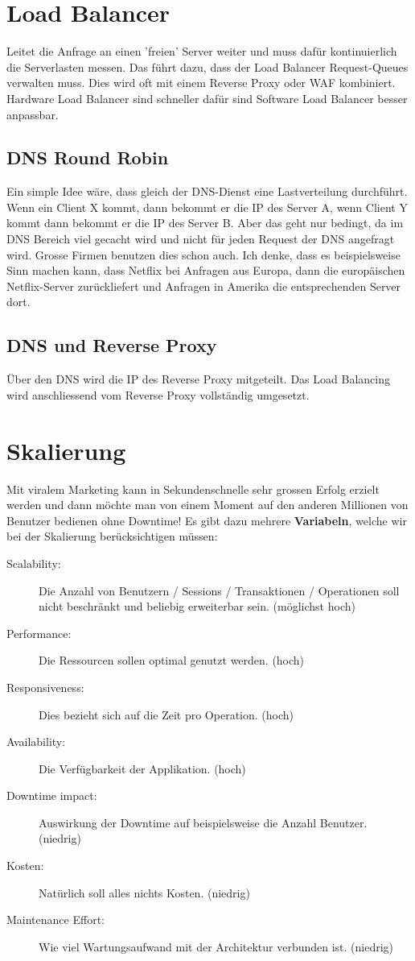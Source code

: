 \section{Load Balancer}
Leitet die Anfrage an einen 'freien' Server weiter und muss dafür kontinuierlich die Serverlasten messen. Das führt dazu, dass der Load Balancer Request-Queues verwalten muss. Dies wird oft mit einem Reverse Proxy oder WAF kombiniert. Hardware Load Balancer sind schneller dafür sind Software Load Balancer besser anpassbar. 

\subsection{DNS Round Robin}
Ein simple Idee wäre, dass gleich der DNS-Dienst eine Lastverteilung durchführt. Wenn ein Client X kommt, dann bekommt er die IP des Server A, wenn Client Y kommt dann bekommt er die IP des Server B. Aber das geht nur bedingt, da im DNS Bereich viel gecacht wird und nicht für jeden Request der DNS angefragt wird. Grosse Firmen benutzen dies schon auch. Ich denke, dass es beispielsweise Sinn machen kann, dass Netflix bei Anfragen aus Europa, dann die europäischen Netflix-Server zurückliefert und Anfragen in Amerika die entsprechenden Server dort.

\subsection{DNS und Reverse Proxy}
Über den DNS wird die IP des Reverse Proxy mitgeteilt. Das Load Balancing wird anschliessend vom Reverse Proxy vollständig umgesetzt.

\section{Skalierung}
Mit viralem Marketing kann in Sekundenschnelle sehr grossen Erfolg erzielt werden und dann möchte man von einem Moment auf den anderen Millionen von Benutzer bedienen ohne Downtime! Es gibt dazu mehrere \textbf{Variabeln}, welche wir bei der Skalierung berücksichtigen müssen:

\begin{description}
	\item[Scalability:] Die Anzahl von Benutzern / Sessions / Transaktionen / Operationen soll nicht beschränkt und beliebig erweiterbar sein. (möglichst hoch)
	\item[Performance:] Die Ressourcen sollen optimal genutzt werden. (hoch)
	\item[Responsiveness:] Dies bezieht sich auf die Zeit pro Operation. (hoch)
	\item[Availability:] Die Verfügbarkeit der Applikation. (hoch)
	\item[Downtime impact:] Auswirkung der Downtime auf beispielsweise die Anzahl Benutzer. (niedrig)
	\item[Kosten:] Natürlich soll alles nichts Kosten. (niedrig)
	\item[Maintenance Effort:] Wie viel Wartungsaufwand mit der Architektur verbunden ist. (niedrig)
\end{description}

